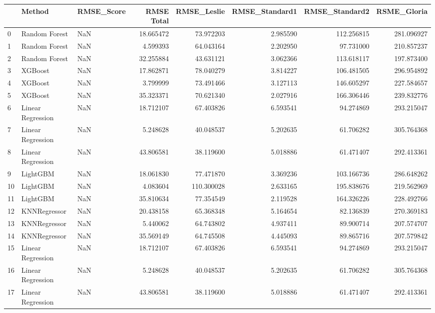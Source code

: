 \begin{tabular}{lllrrrrr}
\toprule
{} &             Method & RMSE\_Score &  RMSE Total &  RMSE\_Leslie &  RMSE\_Standard1 &  RMSE\_Standard2 &  RSME\_Gloria \\
\midrule
0  &      Random Forest &        NaN &   18.665472 &    73.972203 &        2.985590 &      112.256815 &   281.096927 \\
1  &      Random Forest &        NaN &    4.599393 &    64.043164 &        2.202950 &       97.731000 &   210.857237 \\
2  &      Random Forest &        NaN &   32.255884 &    43.631121 &        3.062366 &      113.618117 &   197.873400 \\
3  &            XGBoost &        NaN &   17.862871 &    78.040279 &        3.814227 &      106.481505 &   296.954892 \\
4  &            XGBoost &        NaN &    3.799999 &    73.491466 &        3.127113 &      146.605297 &   227.584657 \\
5  &            XGBoost &        NaN &   35.323371 &    70.621340 &        2.027916 &      166.306446 &   239.832776 \\
6  &  Linear Regression &        NaN &   18.712107 &    67.403826 &        6.593541 &       94.274869 &   293.215047 \\
7  &  Linear Regression &        NaN &    5.248628 &    40.048537 &        5.202635 &       61.706282 &   305.764368 \\
8  &  Linear Regression &        NaN &   43.806581 &    38.119600 &        5.018886 &       61.471407 &   292.413361 \\
9  &           LightGBM &        NaN &   18.061830 &    77.471870 &        3.369236 &      103.166736 &   286.648262 \\
10 &           LightGBM &        NaN &    4.083604 &   110.300028 &        2.633165 &      195.838676 &   219.562969 \\
11 &           LightGBM &        NaN &   35.810634 &    77.354549 &        2.119528 &      164.326226 &   228.492766 \\
12 &       KNNRegressor &        NaN &   20.438158 &    65.368348 &        5.164654 &       82.136839 &   270.369183 \\
13 &       KNNRegressor &        NaN &    5.440062 &    64.743802 &        4.937411 &       89.900714 &   207.574707 \\
14 &       KNNRegressor &        NaN &   35.569149 &    64.745508 &        4.445093 &       89.865716 &   207.579842 \\
15 &  Linear Regression &        NaN &   18.712107 &    67.403826 &        6.593541 &       94.274869 &   293.215047 \\
16 &  Linear Regression &        NaN &    5.248628 &    40.048537 &        5.202635 &       61.706282 &   305.764368 \\
17 &  Linear Regression &        NaN &   43.806581 &    38.119600 &        5.018886 &       61.471407 &   292.413361 \\
\bottomrule
\end{tabular}
